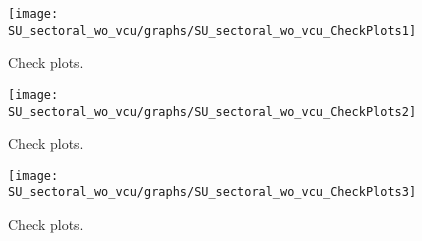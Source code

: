  
\begin{figure}[H]
\centering 
\texttt{[image: SU\_sectoral\_wo\_vcu/graphs/SU\_sectoral\_wo\_vcu\_CheckPlots1]}
\caption{Check plots.}\label{Fig:CheckPlots:1}
\end{figure}
 
\begin{figure}[H]
\centering 
\texttt{[image: SU\_sectoral\_wo\_vcu/graphs/SU\_sectoral\_wo\_vcu\_CheckPlots2]}
\caption{Check plots.}\label{Fig:CheckPlots:2}
\end{figure}
 
\begin{figure}[H]
\centering 
\texttt{[image: SU\_sectoral\_wo\_vcu/graphs/SU\_sectoral\_wo\_vcu\_CheckPlots3]}
\caption{Check plots.}\label{Fig:CheckPlots:3}
\end{figure}
 
